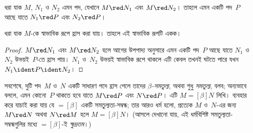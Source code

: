 \documentclass[../../../include/open-logic-section]{subfiles}
\begin{document}

\begin{thm}
ধরা যাক $M$, $N_1$ ও $N_2$ এমন পদ, যেখানে $M \red N_1$ এবং $M \red
N_2$। তাহলে এমন একটি পদ~$P$ আছে যাতে $N_1 \red P$ এবং $N_2 \red P$।
\end{thm}

\begin{cor}
ধরা যাক $M$-কে স্বাভাবিক রূপে হ্রাস করা যায়। তাহলে এই স্বাভাবিক রূপটি
একক।
\end{cor}

\begin{proof}
$M \red N_1$ এবং $M \red N_2$ হলে আগের উপপাদ্য অনুসারে এমন একটি
পদ~$P$ আছে যাতে $N_1$ ও $N_2$ উভয়ই~$P$-তে হ্রাস পায়। $N_1$ ও~$N_2$
উভয়ই স্বাভাবিক রূপে থাকলে এটি কেবল তখনই ঘটতে পারে যখন $N_1 \ident P
\ident N_2$।
\end{proof}

সবশেষে, দুটি পদ~$M$ ও~$N$ একটি সাধারণ পদে হ্রাস পেলে তাদের
\emph{$\beta$-সমতুল্য}, অথবা শুধু \emph{সমতুল্য}, বলব; অন্যভাবে বললে,
এমন কোনো~$P$ থাকতে হবে যাতে $M \red P$ এবং $N \red P$। এটি $M
\equal[\beta] N$ লিখি।  ব্যবহার করে যাচাই করা
যায় যে $\equal[\beta]$ একটি সমতুল্যতা-সম্বন্ধ; তার আরও ধর্ম হলো, প্রত্যেক
$M$ ও~$N$-এর জন্য $M \red N$ অথবা $N \red M$ হলে $M \equal[\beta]
N$। (আসলে দেখানো যায়, এই ধর্মবিশিষ্ট সমতুল্যতা-সম্বন্ধগুলির মধ্যে
$\equal[\beta]$-ই \emph{ক্ষুদ্রতম}।)
\end{document}
